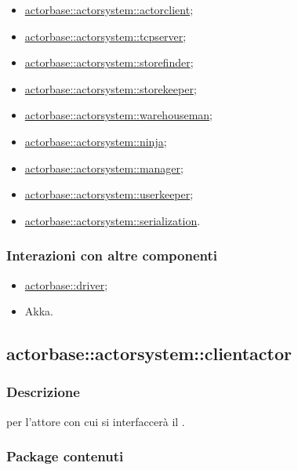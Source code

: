 \documentclass{scalatekids-article}
\begin{document}
\begin{itemize}
\item \hyperref[sec:actorbase::actorsystem::actorclient]{actorbase::actorsystem::actorclient};
\item \hyperref[sec:actorbase::actorsystem::actorclient]{actorbase::actorsystem::tcpserver};
\item \hyperref[sec:actorbase::actorsystem::actorclient]{actorbase::actorsystem::storefinder};
\item \hyperref[sec:actorbase::actorsystem::actorclient]{actorbase::actorsystem::storekeeper};
\item \hyperref[sec:actorbase::actorsystem::actorclient]{actorbase::actorsystem::warehouseman};
\item \hyperref[sec:actorbase::actorsystem::actorclient]{actorbase::actorsystem::ninja};
\item \hyperref[sec:actorbase::actorsystem::actorclient]{actorbase::actorsystem::manager};
\item \hyperref[sec:actorbase::actorsystem::actorclient]{actorbase::actorsystem::userkeeper};
\item \hyperref[sec:actorbase::actorsystem::actorclient]{actorbase::actorsystem::serialization}.
\end{itemize}

\subsubsection{Interazioni con altre componenti}

\begin{itemize}
\item \hyperref[sec:actorbase::driver]{actorbase::driver};
\item Akka.
\end{itemize}

\subsection{actorbase::actorsystem::clientactor}
\label{sec:actorbase::actorsystem::clientactor}

\subsubsection{Descrizione}

 per l'attore con cui si interfaccerà il .

\subsubsection{Package contenuti}
\end{document}
